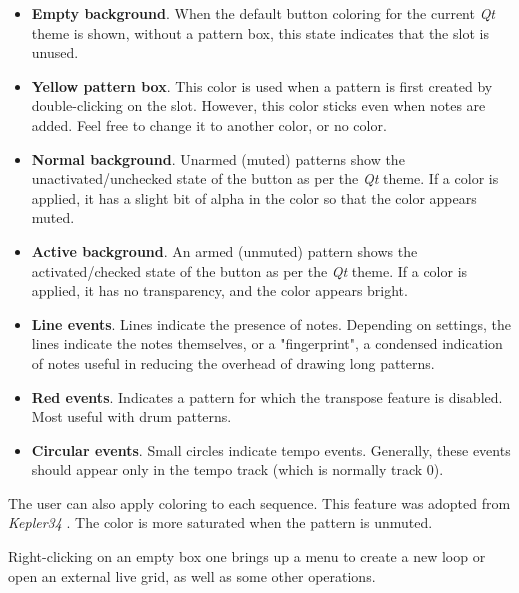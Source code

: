    \begin{itemize}
      \item \textbf{Empty background}.
         When the default button coloring for
         the current \textsl{Qt} theme is shown, without a pattern box,
         this state indicates that the slot is unused.
      \item \textbf{Yellow pattern box}.
         This color is used when a pattern is
         first created by double-clicking on the slot.
         However, this color sticks even when notes are added.
         Feel free to change it to another color, or no color.
      \item \textbf{Normal background}.
         Unarmed (muted) patterns show the
         unactivated/unchecked state of the button as per the \textsl{Qt}
         theme.  If a color is applied, it has a slight bit of alpha in the
         color so that the color appears muted.
      \item \textbf{Active background}.
         An armed (unmuted) pattern shows the
         activated/checked state of the button as per the \textsl{Qt}
         theme.  If a color is applied, it has no transparency, and the 
         color appears bright.
      \item \textbf{Line events}.
         Lines indicate the presence of notes.  Depending on settings, the
         lines indicate the notes themselves, or a "fingerprint", a condensed
         indication of notes useful in reducing the overhead of
         drawing long patterns.
      \item \textbf{Red events}.
         Indicates a pattern for which the transpose feature is
         disabled.  Most useful with drum patterns.
      \item \textbf{Circular events}.
         Small circles indicate tempo events.  Generally, these events should
         appear only in the tempo track (which is normally track 0).
   \end{itemize}

   The user can also apply coloring to each sequence.
   This feature was adopted from \textsl{Kepler34} \cite{kepler34}.
   The color is more saturated when the pattern is unmuted.

   Right-clicking on an empty box one brings up a menu to create
   a new loop or open an external live grid, as well as some other operations.

